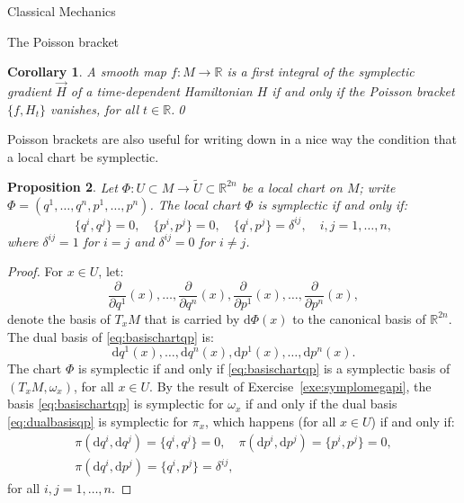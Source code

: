 \documentclass[oneside,a4paper,11pt]{amsbook}
\newcommand{\R}{\mathds R}
\newcommand{\dd}{\mathrm d}
\theoremstyle{remark}\newtheorem{exercise}{Exercise}[chapter]
\theoremstyle{plain}\newtheorem{teo}{Theorem}[section]
\theoremstyle{plain}\newtheorem{lem}[teo]{Lemma}
\theoremstyle{plain}\newtheorem{prop}[teo]{Proposition}
\theoremstyle{plain}\newtheorem{cor}[teo]{Corollary}
\theoremstyle{definition}\newtheorem{defin}[teo]{Definition}
\theoremstyle{remark}\newtheorem{rem}[teo]{Remark}
\theoremstyle{definition}\newtheorem{notation}[teo]{Notation}
\theoremstyle{definition}\newtheorem{convention}[teo]{Convention}
\theoremstyle{definition}\newtheorem{example}[teo]{Example}
\numberwithin{section}{chapter}
\numberwithin{equation}{section}
\begin{document}
\begin{chapter}{Classical Mechanics}
\begin{section}{The Poisson bracket}
\begin{cor}
A smooth map $f:M\to\R$ is a first integral of the symplectic gradient $\vec H$ of a time-dependent Hamiltonian
$H$ if and only if the Poisson bracket $\{f,H_t\}$ vanishes, for all $t\in\R$.\qed
\end{cor}

Poisson brackets are also useful for writing down in a nice way the condition that a local chart be symplectic.
\begin{prop}
Let $\Phi:U\subset M\to\widetilde U\subset\R^{2n}$ be a local chart on $M$; write $\Phi=(q^1,\ldots,q^n,p^1,\ldots,p^n)$. The local chart $\Phi$
is symplectic if and only if:
\[\{q^i,q^j\}=0,\quad\{p^i,p^j\}=0,\quad\{q^i,p^j\}=\delta^{ij},\quad i,j=1,\ldots,n,\]
where $\delta^{ij}=1$ for $i=j$ and $\delta^{ij}=0$ for $i\ne j$.
\end{prop}
\begin{proof}
For $x\in U$, let:
\begin{equation}\label{eq:basischartqp}
\frac{\partial}{\partial q^1}(x),\ldots,\frac{\partial}{\partial q^n}(x),\frac{\partial}{\partial p^1}(x),\ldots,\frac{\partial}{\partial p^n}(x),
\end{equation}
denote the basis of $T_xM$ that is carried by $\dd\Phi(x)$ to the canonical basis of $\R^{2n}$. The dual basis of \eqref{eq:basischartqp} is:
\begin{equation}\label{eq:dualbasisqp}
\dd q^1(x),\ldots,\dd q^n(x),\dd p^1(x),\ldots,\dd p^n(x).
\end{equation}
The chart $\Phi$ is symplectic if and only if \eqref{eq:basischartqp} is a symplectic basis of $(T_xM,\omega_x)$, for all $x\in U$.
By the result of Exercise~\ref{exe:symplomegapi}, the basis \eqref{eq:basischartqp} is symplectic for $\omega_x$ if and only if the dual basis
\eqref{eq:dualbasisqp} is symplectic for $\pi_x$, which happens (for all $x\in U$) if and only if:
\begin{gather*}
\pi(\dd q^i,\dd q^j)=\{q^i,q^j\}=0,\quad\pi(\dd p^i,\dd p^j)=\{p^i,p^j\}=0,\\
\pi(\dd q^i,\dd p^j)=\{q^i,p^j\}=\delta^{ij},
\end{gather*}
for all $i,j=1,\ldots,n$.
\end{proof}


\end{section}
\end{chapter}
\end{document}
